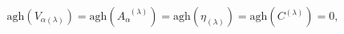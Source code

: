 \begin{equation}
\mathrm{agh}\left( V_{\alpha (\lambda )}\right) =\mathrm{agh}\left(
A_{\alpha }^{\;\;(\lambda )}\right) =\mathrm{agh}\left( \eta _{(\lambda
)}\right) =\mathrm{agh}\left( C^{(\lambda )}\right) =0,  \label{bf41}
\end{equation}

